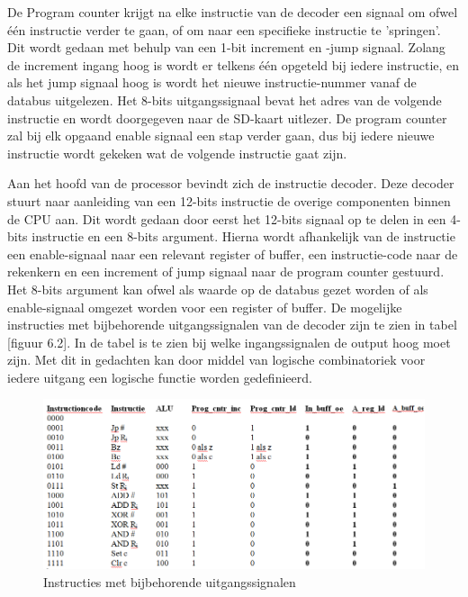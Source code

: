 \documentclass[oneside,dutch]{tudelft-report}
\begin{document}
De Program counter krijgt na elke instructie van de decoder een signaal om ofwel één instructie verder te gaan, of om naar een specifieke instructie te 'springen'. Dit wordt gedaan met behulp van een 1-bit increment en -jump signaal. Zolang de increment ingang hoog is wordt er telkens één opgeteld bij iedere instructie, en als het jump signaal hoog is wordt het nieuwe instructie-nummer vanaf de databus uitgelezen. Het 8-bits uitgangssignaal bevat het adres van de volgende instructie en wordt doorgegeven naar de SD-kaart uitlezer. De program counter zal bij elk opgaand enable signaal een stap verder gaan, dus bij iedere nieuwe instructie wordt gekeken wat de volgende instructie gaat zijn.


Aan het hoofd van de processor bevindt zich de instructie decoder. Deze decoder stuurt naar aanleiding van een 12-bits instructie de overige componenten binnen de CPU aan. Dit wordt gedaan door eerst het 12-bits signaal op te delen in een 4-bits instructie en een 8-bits argument. Hierna wordt afhankelijk van de instructie een enable-signaal naar een relevant register of buffer, een instructie-code naar de rekenkern en een increment of jump signaal naar de program counter gestuurd. Het 8-bits argument kan ofwel als waarde op de databus gezet worden of als enable-signaal omgezet worden voor een register of buffer. De mogelijke instructies met bijbehorende uitgangssignalen van de decoder zijn te zien in tabel [figuur 6.2]. In de tabel is te zien bij welke ingangssignalen de output hoog moet zijn. Met dit in gedachten kan door middel van logische combinatoriek voor iedere uitgang een logische functie worden gedefinieerd.

\begin{figure}[H]
\center
\includegraphics[width=12cm]{tabel}
\caption{Instructies met bijbehorende uitgangssignalen}
\label{CPU}
\end{figure}
\end{document}
